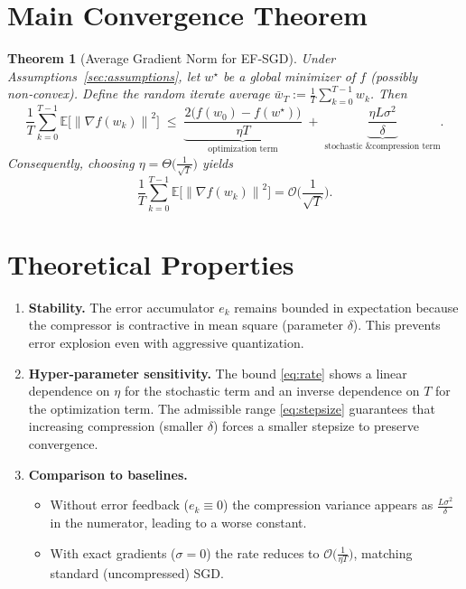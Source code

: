 \documentclass{article}
\newtheorem{theorem}{Theorem}
\newcommand{\E}{\mathbb{E}}
\newcommand{\norm}[1]{\left\|#1\right\|}
\begin{document}
\section*{Main Convergence Theorem}
\begin{theorem}[Average Gradient Norm for EF‑SGD]\label{thm:main}
Under Assumptions~\ref{sec:assumptions}, let $w^\star$ be a global minimizer of $f$ (possibly non‑convex).  
Define the random iterate average $\bar w_T:=\frac{1}{T}\sum_{k=0}^{T-1}w_k$. Then
\begin{equation}
    \frac{1}{T}\sum_{k=0}^{T-1}\E\!\big[\norm{\nabla f(w_k)}^2\big]
    \;\le\;
    \underbrace{\frac{2\big(f(w_0)-f(w^\star)\big)}{\eta T}}_{\text{optimization term}}
    \;+\;
    \underbrace{\frac{\eta L\sigma^2}{\delta}}_{\text{stochastic \& compression term}} .
    \label{eq:rate}
\end{equation}
Consequently, choosing $\eta =\Theta\!\big(\frac{1}{\sqrt{T}}\big)$ yields
\[
    \frac{1}{T}\sum_{k=0}^{T-1}\E\!\big[\norm{\nabla f(w_k)}^2\big]=\mathcal{O}\!\Big(\frac{1}{\sqrt{T}}\Big).
\]
\end{theorem}

\section*{Theoretical Properties}
\begin{enumerate}
    \item \textbf{Stability.} The error accumulator $e_k$ remains bounded in expectation because the compressor is contractive in mean square (parameter $\delta$). This prevents error explosion even with aggressive quantization.
    \item \textbf{Hyper‑parameter sensitivity.} The bound \eqref{eq:rate} shows a linear dependence on $\eta$ for the stochastic term and an inverse dependence on $T$ for the optimization term. The admissible range \eqref{eq:stepsize} guarantees that increasing compression (smaller $\delta$) forces a smaller stepsize to preserve convergence.
    \item \textbf{Comparison to baselines.}
    \begin{itemize}
        \item Without error feedback ($e_k\equiv0$) the compression variance appears as $\frac{L\sigma^2}{\delta}$ in the numerator, leading to a worse constant.
        \item With exact gradients ($\sigma=0$) the rate reduces to $\mathcal{O}\big(\frac{1}{\eta T}\big)$, matching standard (uncompressed) SGD.
    \end{itemize}
\end{enumerate}
\end{document}
